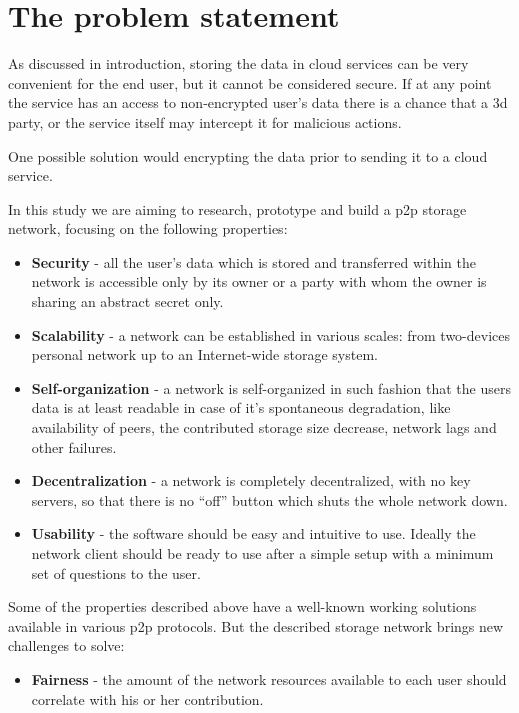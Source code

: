 \section{The problem statement}

As discussed in introduction, storing the data in cloud services
can be very convenient for the end user, but it cannot be considered
secure. If at any point the service has an access to non-encrypted
user's data there is a chance that a 3d party, or the service itself
may intercept it for malicious actions.

One possible solution would encrypting the data prior to sending it
to a cloud service.

In this study we are aiming to research, prototype and build a p2p storage
network, focusing on the following properties:

\begin{itemize}
\item \textbf{Security} - all the user's data which is stored and transferred
  within the network is accessible only by its owner or a party with whom the
  owner is sharing an abstract secret only.
\item \textbf{Scalability} - a network can be established in various
  scales: from two-devices personal network up to an Internet-wide storage
  system.
\item \textbf{Self-organization} - a network is self-organized in such
  fashion that the users data is at least readable in case of it's spontaneous
  degradation, like availability of peers, the contributed storage size
  decrease, network lags and other failures.
\item \textbf{Decentralization} - a network is completely decentralized,
  with no key servers, so that there is no ``off'' button which shuts the
  whole network down.
\item \textbf{Usability} - the software should be easy and intuitive to
  use. Ideally the network client should be ready to use after a  simple
  setup with a minimum set of questions to the user.
\end{itemize}

Some of the properties described above have a well-known working solutions
available in various p2p protocols. But the described storage network brings
new challenges to solve:

\begin{itemize}
\item \textbf{Fairness} - the amount of the network resources available
  to each user should correlate with his or her contribution.
\end{itemize}

